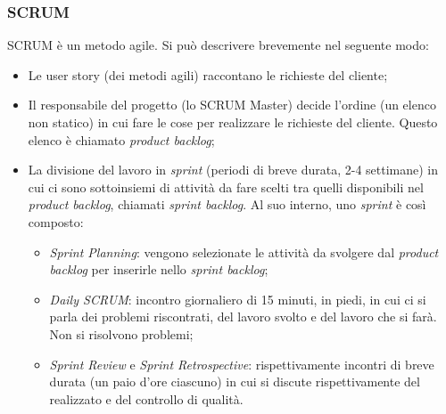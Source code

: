 \documentclass[../main]{subfiles}
\begin{document}
\subsubsection{SCRUM}
SCRUM è un metodo agile. Si può descrivere brevemente nel seguente modo:
\begin{itemize}
    \item Le user story (dei metodi agili) raccontano le richieste del cliente;
    \item Il responsabile del progetto (lo SCRUM Master) decide l'ordine (un elenco non statico) in cui fare le cose per realizzare le richieste del cliente. Questo elenco è chiamato \textit{product backlog};
    \item La divisione del lavoro in \textit{sprint} (periodi di breve durata, 2-4 settimane) in cui ci sono sottoinsiemi di attività da fare scelti tra quelli disponibili nel \textit{product backlog}, chiamati \textit{sprint backlog}. Al suo interno, uno \textit{sprint} è così composto:
    \begin{itemize}
        \item \textit{Sprint Planning}: vengono selezionate le attività da svolgere dal \textit{product backlog} per inserirle nello \textit{sprint backlog};
        \item \textit{Daily SCRUM}: incontro giornaliero di 15 minuti, in piedi, in cui ci si parla dei problemi riscontrati, del lavoro svolto e del lavoro che si farà. Non si risolvono problemi;
        \item \textit{Sprint Review} e \textit{Sprint Retrospective}: rispettivamente incontri di breve durata (un paio d'ore ciascuno) in cui si discute rispettivamente del  realizzato e del controllo di qualità.
    \end{itemize}
\end{itemize}
\end{document}
